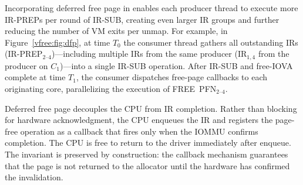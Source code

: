 Incorporating deferred free page in {\vfreename} enables each producer thread to execute more IR-PREPs per round of IR-SUB,
creating even larger IR groups and further reducing the number of VM exits per unmap.
For example, in Figure~\ref{vfree:fig:dfp}, at time $T_0$ the consumer thread gathers
all outstanding IRs (IR-PREP$_{2\text{--}4}$)---including multiple IRs from the same producer
(IR$_{1,4}$ from the producer on $C_1$)---into a single IR-SUB operation.
After IR-SUB and free-IOVA complete at time $T_1$, the consumer dispatches free-page callbacks
to each originating core, parallelizing the execution of FREE~PFN$_{2\text{--}4}$.


Deferred free page decouples the CPU from IR completion. Rather than blocking for hardware acknowledgment, 
    the CPU enqueues the IR and registers the page-free operation 
    as a callback that fires only when the IOMMU confirms completion.
The CPU is free to return to the driver immediately after enqueue.
The invariant is preserved by construction: 
    the callback mechanism guarantees that the page is not returned to the allocator 
    until the hardware has confirmed the invalidation.


    


